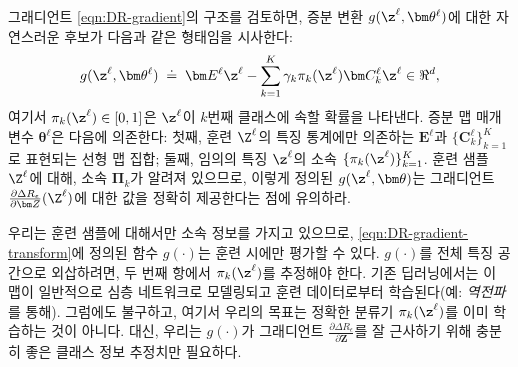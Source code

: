 \documentclass[../../book-main_ko.tex]{subfiles}
\begin{document}
그래디언트 \eqref{eqn:DR-gradient}의 구조를 검토하면, 증분 변환 $g(\z^\ell, \bm \theta^\ell)$에 대한 자연스러운 후보가 다음과 같은 형태임을 시사한다:
\begin{equation}
    g(\z^\ell, \bm \theta^\ell) \; \doteq \; \bm E^\ell \z^\ell - \sum_{k=1}^K \gamma_{k} \pi_k(\z^\ell)\bm C_{k}^{\ell}  \z^{\ell}  \in \Re^d,
    \label{eqn:DR-gradient-transform}
\end{equation}
여기서 $\pi_k(\z^\ell) \in [0,1]$은 $\z^{\ell}$이 $k$번째 클래스에 속할 확률을 나타낸다. 증분 맵 매개변수 $\bm \theta^\ell$은 다음에 의존한다: 첫째, 훈련 $\Z^\ell$의 특징 통계에만 의존하는 $\bm E^{\ell}$과 $\{ \bm C^{\ell}_{k}\}_{k=1}^{K}$로 표현되는 선형 맵 집합; 둘째, 임의의 특징 $\z^\ell$의 소속 $\{ \pi_k(\z^\ell)\}_{k=1}^K$.
훈련 샘플 $\Z^\ell$에 대해, 소속 $\bm \Pi_k$가 알려져 있으므로,  이렇게 정의된 $g(\z^\ell, \bm \theta)$는 그래디언트 $\frac{\partial \Delta R_{\epsilon}}{\partial \bm Z}(\Z^\ell)$에 대한 값을 정확히 제공한다는 점에 유의하라.  


우리는 훈련 샘플에 대해서만 소속 정보를 가지고 있으므로, \eqref{eqn:DR-gradient-transform}에 정의된 함수 $g(\cdot)$는 훈련 시에만 평가할 수 있다. $g(\cdot)$를 전체 특징 공간으로 외삽하려면, 두 번째 항에서 $\pi_k(\z^\ell)$를 추정해야 한다. 기존 딥러닝에서는 이 맵이 일반적으로 심층 네트워크로 모델링되고 훈련 데이터로부터 학습된다(예: {\em 역전파}를 통해). 그럼에도 불구하고, 여기서 우리의 목표는 정확한 분류기 $\pi_{k}(\z^\ell)$를 이미 학습하는 것이 아니다. 대신, 우리는 $g(\cdot)$가 그래디언트 $\frac{\partial \Delta R_{\epsilon}}{\partial \bm Z}$를 잘 근사하기 위해 충분히 좋은 클래스 정보 추정치만 필요하다. 
\end{document}
